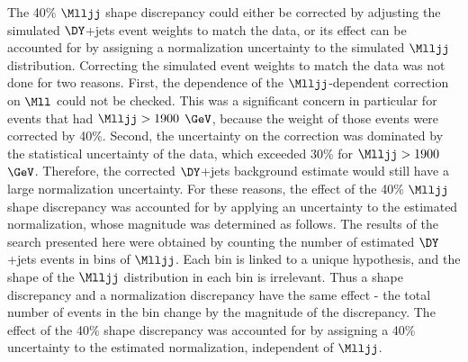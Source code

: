 The 40\% $\Mlljj$ shape discrepancy could either be corrected by adjusting the simulated $\DY$+jets event weights to match the data, or its 
effect can be accounted for by assigning a normalization uncertainty to the simulated $\Mlljj$ distribution.  Correcting the simulated 
event weights to match the data was not done for two reasons.  First, the dependence of the $\Mlljj$-dependent correction on $\Mll$ could 
not be checked.  This was a significant concern in particular for events that had $\Mlljj > 1900$ $\GeV$, because the weight of those 
events were corrected by 40\%.  Second, the uncertainty on the correction was dominated by the statistical uncertainty of the data, which 
exceeded 30\% for $\Mlljj > 1900$ $\GeV$.  Therefore, the corrected $\DY$+jets background estimate would still have a large normalization 
uncertainty.  For these reasons, the effect of the 40\% $\Mlljj$ shape discrepancy was accounted for by applying an uncertainty to the 
estimated \DY normalization, whose magnitude was determined as follows.  The results of the search presented here were obtained by counting 
the number of estimated $\DY$+jets events in bins of $\Mlljj$.  Each bin is linked to a unique \mWR hypothesis, and the shape of the \DY 
$\Mlljj$ distribution in each bin is irrelevant.  Thus a shape discrepancy and a normalization discrepancy have the same effect - the total 
number of events in the bin change by the magnitude of the discrepancy.  The effect of the 40\% shape discrepancy was accounted for by 
assigning a 40\% uncertainty to the estimated \DY normalization, independent of $\Mlljj$.

